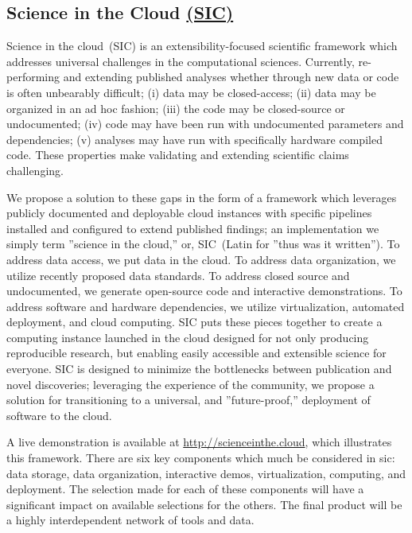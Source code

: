 \documentclass[simplex.tex]{subfiles}
\begin{document}
\subsection[Science in the Cloud]{Science in the Cloud \href{http://scienceinthe.cloud}{(SIC)}}
Science in the cloud~(SIC) is an extensibility-focused scientific framework which addresses universal
challenges in the computational sciences. Currently, re-performing and extending published analyses
whether through new data or code is often unbearably difficult; (i) data may be closed-access; (ii) data 
may be organized in an ad hoc fashion; (iii) the code may be closed-source or undocumented; (iv) code may
have been run with undocumented parameters and dependencies; (v) analyses may have run with specifically
hardware compiled code. These properties make validating and extending scientific claims challenging.

We propose a solution to these gaps in the form of a framework which leverages publicly documented and deployable
cloud instances with specific pipelines installed and configured to extend published findings; an implementation we
simply term ''science in the cloud,'' or, SIC~(Latin for ''thus was it written'').
To address data access, we put data in the cloud.
To address data organization, we utilize recently proposed data standards.
To address closed source and undocumented, we generate open-source code and interactive demonstrations.
To address software and hardware dependencies, we utilize virtualization, automated deployment, and cloud computing.
SIC puts these pieces together to create a computing instance launched in the cloud designed for not only
producing reproducible research, but enabling easily accessible and extensible science for everyone. SIC is designed
to minimize the bottlenecks between publication and novel discoveries; leveraging the experience of the community,
we propose a solution for transitioning to a universal, and ''future-proof,'' deployment of software to the cloud.

A live demonstration is available at \href{http://scienceinthe.cloud}{http://scienceinthe.cloud}, which illustrates
this framework. There are six key components which much be considered in sic: data storage, data organization,
interactive demos, virtualization, computing, and deployment. The selection made for each of these components
will have a significant impact on available selections for the others. The final product will be a highly
interdependent network of tools and data.
\end{document}
